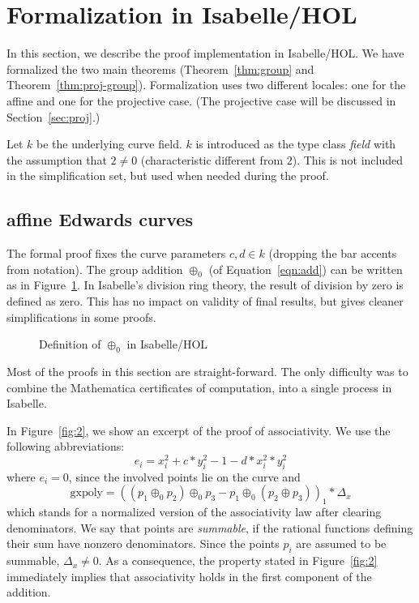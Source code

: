 \documentclass{llncs}
\begin{document}
\section{Formalization in Isabelle/HOL}

In this section, we describe the proof implementation in Isabelle/HOL.
We have formalized the two main theorems (Theorem~\ref{thm:group} and
Theorem~\ref{thm:proj-group}).  Formalization uses two different
locales: one for the affine and one for the projective case. (The
projective case will be discussed in Section~\ref{sec:proj}.)

Let $k$ be the underlying curve field. $k$ is introduced as the type
class \textit{field} with the assumption that $2 \neq 0$
(characteristic different from $2$). This is not included in the
simplification set, but used when needed during the proof.


\subsection{affine Edwards curves}

The formal proof fixes the curve parameters $c,d \in k$ (dropping the
bar accents from notation). The group addition $\oplus_0$ (of
Equation~\ref{eqn:add}) can be written as in Figure~\ref{fig:1}.  In
Isabelle's division ring theory, the result of division by zero is
defined as zero. This has no impact on validity of final results, but
gives cleaner simplifications in some proofs.

\begin{figure}
	{}
	\caption{Definition of $\oplus_0$ in Isabelle/HOL}
	\label{fig:1}
\end{figure}

Most of the proofs in this section are straight-forward. The only
difficulty was to combine the Mathematica certificates of computation, 
into a single process in Isabelle.

In Figure~\ref{fig:2}, we show an excerpt of the proof of
associativity. We use the following abbreviations: 
\[
e_i = x_i^2 + c *
y_i^2 - 1 - d * x_i^2 * y_i^2 
\] 
where $e_i = 0$, since the involved
points lie on the curve and 
\[
\text{gxpoly} = ((p_1 \oplus_0 p_2)
\oplus_0 p_3 - p_1 \oplus_0 (p_2 \oplus p_3))_1*\Delta_x
\] 
which stands for a normalized version of the associativity law after
clearing denominators. We say that points are \emph{summable}, if the
rational functions defining their sum have nonzero denominators.
Since the points $p_i$ are assumed to be summable, $\Delta_x \neq
0$. As a consequence, the property stated in Figure~\ref{fig:2}
immediately implies that associativity holds in the first component of
the addition.
\end{document}
